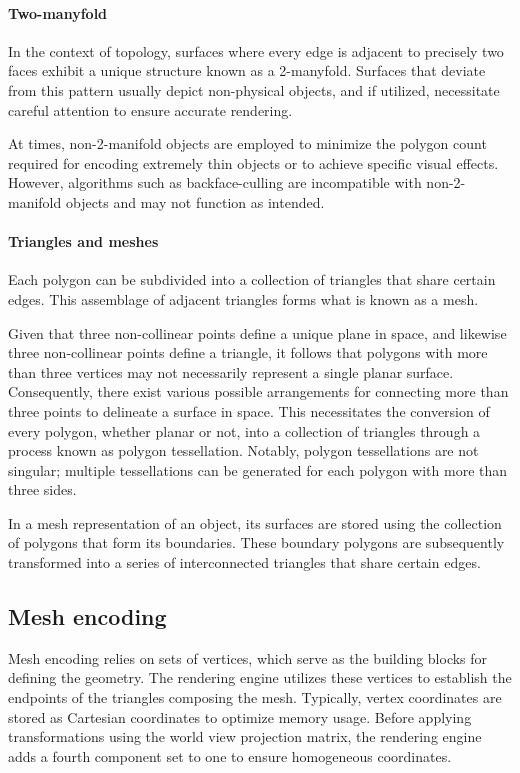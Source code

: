 \paragraph*{Two-manyfold}
In the context of topology, surfaces where every edge is adjacent to precisely two faces exhibit a unique structure known as a 2-manyfold. 
Surfaces that deviate from this pattern usually depict non-physical objects, and if utilized, necessitate careful attention to ensure accurate rendering.

At times, non-2-manifold objects are employed to minimize the polygon count required for encoding extremely thin objects or to achieve specific visual effects.
However, algorithms such as backface-culling are incompatible with non-2-manifold objects and may not function as intended.

\paragraph*{Triangles and meshes}
Each polygon can be subdivided into a collection of triangles that share certain edges. 
This assemblage of adjacent triangles forms what is known as a mesh.

Given that three non-collinear points define a unique plane in space, and likewise three non-collinear points define a triangle, it follows that polygons with more than three vertices may not necessarily represent a single planar surface. 
Consequently, there exist various possible arrangements for connecting more than three points to delineate a surface in space. 
This necessitates the conversion of every polygon, whether planar or not, into a collection of triangles through a process known as polygon tessellation. 
Notably, polygon tessellations are not singular; multiple tessellations can be generated for each polygon with more than three sides.

In a mesh representation of an object, its surfaces are stored using the collection of polygons that form its boundaries. 
These boundary polygons are subsequently transformed into a series of interconnected triangles that share certain edges.

\subsection{Mesh encoding}
Mesh encoding relies on sets of vertices, which serve as the building blocks for defining the geometry. 
The rendering engine utilizes these vertices to establish the endpoints of the triangles composing the mesh. 
Typically, vertex coordinates are stored as Cartesian coordinates to optimize memory usage. 
Before applying transformations using the world view projection matrix, the rendering engine adds a fourth component set to one to ensure homogeneous coordinates.

